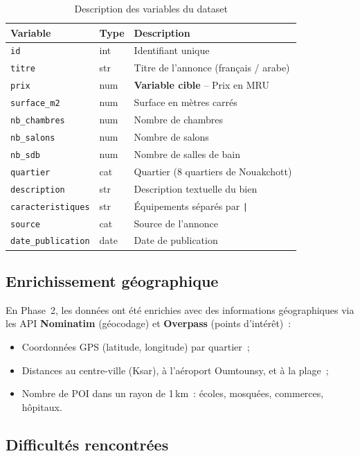\documentclass[12pt, a4paper]{article}
\begin{document}
\begin{table}[H]
\centering
\caption{Description des variables du dataset}
\label{tab:variables}
\begin{tabularx}{\textwidth}{l l X}
\toprule
\textbf{Variable} & \textbf{Type} & \textbf{Description} \\
\midrule
\texttt{id} & int & Identifiant unique \\
\texttt{titre} & str & Titre de l'annonce (français / arabe) \\
\texttt{prix} & num & \textbf{Variable cible} -- Prix en MRU \\
\texttt{surface\_m2} & num & Surface en mètres carrés \\
\texttt{nb\_chambres} & num & Nombre de chambres \\
\texttt{nb\_salons} & num & Nombre de salons \\
\texttt{nb\_sdb} & num & Nombre de salles de bain \\
\texttt{quartier} & cat & Quartier (8 quartiers de Nouakchott) \\
\texttt{description} & str & Description textuelle du bien \\
\texttt{caracteristiques} & str & Équipements séparés par \texttt{|} \\
\texttt{source} & cat & Source de l'annonce \\
\texttt{date\_publication} & date & Date de publication \\
\bottomrule
\end{tabularx}
\end{table}

\subsection{Enrichissement géographique}

En Phase~2, les données ont été enrichies avec des informations géographiques via les API \textbf{Nominatim} (géocodage) et \textbf{Overpass} (points d'intérêt)~:
\begin{itemize}
    \item Coordonnées GPS (latitude, longitude) par quartier~;
    \item Distances au centre-ville (Ksar), à l'aéroport Oumtounsy, et à la plage~;
    \item Nombre de POI dans un rayon de 1\,km~: écoles, mosquées, commerces, hôpitaux.
\end{itemize}

\subsection{Difficultés rencontrées}
\end{document}
